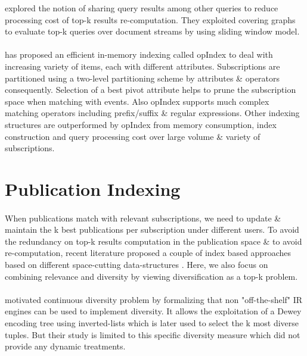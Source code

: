 \documentclass[a4paper,12pt,oneside]{book}
\theoremstyle{definition}
\theoremstyle{remark}
\begin{document}
\cite{Rao2012} explored the notion of sharing query results among other queries to reduce processing cost of top-k results re-computation. They exploited covering graphs to evaluate top-k queries over document streams by using sliding window model. 
\paragraph*{}
\cite{Zhang2014} has proposed an efficient in-memory indexing called opIndex to deal with increasing variety of items, each with different attributes. Subscriptions are partitioned using a two-level partitioning scheme by attributes \& operators consequently. Selection of a best pivot attribute helps to prune the subscription space when matching with events.  Also opIndex supports much complex matching operators including prefix/suffix \& regular expressions. Other indexing structures are outperformed by opIndex from memory consumption, index construction and query processing cost over large volume \& variety of subscriptions.

\section{Publication Indexing}
\label{sec:rwpubindex}
\paragraph*{}
When publications match with relevant subscriptions, we need to update \& maintain the k best publications per subscription under different users. To avoid the redundancy on top-k results computation in the publication space \& to avoid re-computation, recent literature proposed a couple of index based approaches based on different space-cutting data-structures \cite{Vee2008, Drosou2014ExtendedDiversity, Rao2012}. Here, we also focus on combining relevance and diversity by viewing diversification as a top-k problem.
\paragraph*{}
\cite{Vee2008} motivated continuous diversity problem by formalizing that non "off-the-shelf" \ac{IR} engines can be used to implement diversity. It allows the exploitation of a Dewey encoding tree using inverted-lists which is later used to select the k most diverse tuples. But their study is limited to this specific diversity measure which did not provide any dynamic treatments.
\end{document}
